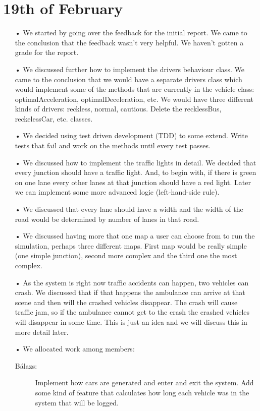 \documentclass[11pt]{article}
\begin{document}
\section{19th of February}
\begin{itemize}
\item[•] We started by going over the feedback for the initial report. We came to the conclusion that the feedback wasn't very helpful. We haven't gotten a grade for the report.
\item[•] We discussed further how to implement the drivers behaviour class. We came to the conclusion that we would have a separate drivers class which would implement some of the methods that are currently in the vehicle class: optimalAcceleration, optimalDeceleration, etc. We would have three different kinds of drivers: reckless, normal, cautious. Delete the recklessBus, reckelessCar, etc. classes.
\item[•] We decided using test driven development (TDD) to some extend. Write tests that fail and work on the methods until every test passes.
\item[•] We discussed how to implement the traffic lights in detail. We decided that every junction should have a traffic light. And, to begin with, if there is green on one lane every other lanes at that junction should have a red light. Later we can implement some more advanced logic (left-hand-side rule).
\item[•] We discussed that every lane should have a width and the width of the road would be determined by number of lanes in that road.
\item[•] We discussed having more that one map a user can choose from to run the simulation, perhaps three different maps. First map would be really simple (one simple junction), second more complex and the third one the most complex.
\item[•] As the system is right now traffic accidents can happen, two vehicles can crash. We discussed that if that happens the ambulance can arrive at that scene and then will the crashed vehicles disappear. The crash will cause traffic jam, so if the ambulance cannot get to the crash the crashed vehicles will disappear in some time. This is just an idea and we will discuss this in more detail later.
\item[•] We allocated work among members:
	\begin{description}
	\item[Bálazs: ]Implement how cars are generated and enter and exit the system. Add some kind of feature that calculates how long each vehicle was in the system that will be logged.

\end{description}
\end{itemize}
\end{document}

